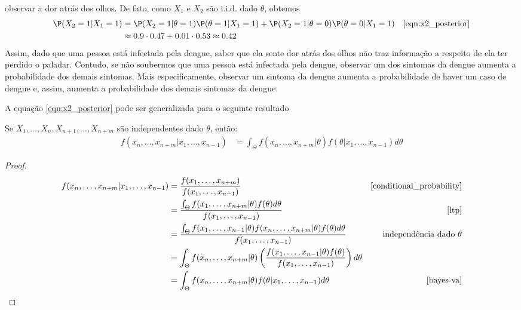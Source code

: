 \begin{example}
 observar a dor atrás dos olhos.
 De fato, como $X_{1}$ e $X_{2}$ são i.i.d. dado 
 $\theta$, obtemos
 \begin{align*}
  \P(X_{2}=1|X_{1}=1)
  &= \P(X_{2}=1|\theta=1)\P(\theta=1|X_{1}=1)
  +\P(X_{2}=1|\theta=0)\P(\theta=0|X_{1}=1)
  & \text{\cref{eqn:x2_posterior}} \\
  &\approx 0.9 \cdot 0.47 + 0.01 \cdot 0.53 \approx 0.42
 \end{align*}
 Assim, dado que uma pessoa está infectada pela dengue,
 saber que ela sente dor atrás dos olhos 
 não traz informação a respeito de ela ter 
 perdido o paladar.
 Contudo, se não soubermos que 
 uma pessoa está infectada pela dengue,
 observar um dos sintomas da dengue aumenta a 
 probabilidade dos demais sintomas.
 Mais especificamente, observar um 
 sintoma da dengue aumenta a probabilidade de 
 haver um caso de dengue e, assim, aumenta a
 probabilidade dos demais sintomas da dengue.
\end{example}

A equação \ref{eqn:x2_posterior} pode ser 
generalizada para o seguinte resultado

\begin{theorem}
 \label{theorem:exchangeable_predictive}
 Se $X_{1},\ldots,X_{n},X_{n+1},\ldots,X_{n+m}$ são 
 independentes dado $\theta$, então:
 \begin{align*}
  f(x_{n},\ldots,x_{n+m}|x_{1},\ldots,x_{n-1})
  &= \int_{\Theta}
  {f(x_{n},\ldots,x_{n+m}|\theta)
  f(\theta|x_{1},\ldots,x_{n-1})d\theta}
 \end{align*}
\end{theorem}

\begin{proof}
 \begin{align*}
  f(x_{n},\ldots,x_{n+m}|x_{1},\ldots,x_{n-1})
  &= \frac{f(x_{1},\ldots,x_{n+m})}
  {f(x_{1},\ldots,x_{n-1})} 
  & \text{\cref{conditional_probability}} \\
  &= \frac{\int_{\Theta}
  {f(x_{1},\ldots,x_{n+m}|\theta)f(\theta)d\theta}}
  {f(x_{1},\ldots,x_{n-1})}
  & \text{\cref{ltp}} \\
  &= \frac{\int_{\Theta}{f(x_{1},\ldots,x_{n-1}|\theta)f(x_{n},\ldots,x_{n+m}|\theta)f(\theta)d\theta}}{f(x_{1},\ldots,x_{n-1})}
  & \text{independência dado $\theta$} \\
  &= \int_{\Theta}{f(x_{n},\ldots,x_{n+m}|\theta) \left(\frac{f(x_{1},\ldots,x_{n-1}|\theta)f(\theta)}{f(x_{1},\ldots,x_{n-1})} \right)d\theta} \\
  &= \int_{\Theta}{f(x_{n},\ldots,x_{n+m}|\theta)f(\theta|x_{1},\ldots,x_{n-1})d\theta}
  & \text{\cref{bayes-va}}
 \end{align*}
\end{proof}

